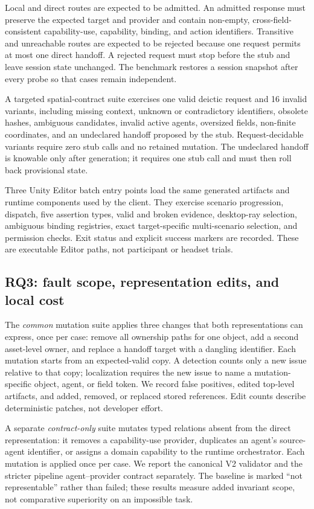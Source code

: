 Local and direct routes are expected to be admitted.  An admitted response must
preserve the expected target and provider and contain non-empty,
cross-field-consistent capability-use, capability, binding, and action
identifiers.  Transitive and unreachable routes are expected to be rejected
because one request permits at most one direct handoff.  A rejected request
must stop before the stub and leave session state unchanged.  The benchmark
restores a session snapshot after every probe so that cases remain independent.

A targeted spatial-contract suite exercises one valid deictic request and 16
invalid variants, including missing context, unknown or contradictory
identifiers, obsolete hashes, ambiguous candidates, invalid active agents,
oversized fields, non-finite coordinates, and an undeclared handoff proposed by
the stub.  Request-decidable variants require zero stub calls and no retained
mutation.  The undeclared handoff is knowable only after generation; it
requires one stub call and must then roll back provisional state.

Three Unity Editor batch entry points load the same generated artifacts and
runtime components used by the client.  They exercise scenario progression,
dispatch, five assertion types, valid and broken evidence, desktop-ray
selection, ambiguous binding registries, exact target-specific multi-scenario
selection, and permission checks.  Exit status and explicit success markers are
recorded.  These are executable Editor paths, not participant or headset
trials.

\subsection{RQ3: fault scope, representation edits, and local cost}

The \emph{common} mutation suite applies three changes that both
representations can express, once per case: remove all ownership paths for one
object, add a second asset-level owner, and replace a handoff target with a
dangling identifier.  Each mutation starts from an expected-valid copy.
A detection counts only a new issue relative to that copy; localization
requires the new issue to name a mutation-specific object, agent, or field
token.  We record false positives, edited top-level artifacts, and added,
removed, or replaced stored references.  Edit counts describe deterministic
patches, not developer effort.

A separate \emph{contract-only} suite mutates typed relations absent from the
direct representation: it removes a capability-use provider, duplicates an
agent's source-agent identifier, or assigns a domain capability to the runtime
orchestrator.  Each mutation is applied once per case.  We report the canonical
V2 validator and the stricter pipeline agent--provider contract separately.
The baseline is marked ``not representable'' rather than failed; these results
measure added invariant scope, not comparative superiority on an impossible
task.

